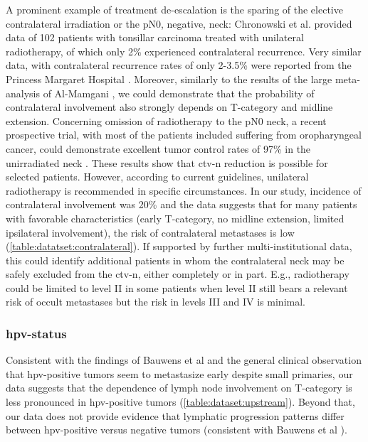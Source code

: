 \documentclass[\relativeRoot/main.tex]{subfiles}
\begin{document}
A prominent example of treatment de-escalation is the sparing of the elective contralateral irradiation or the pN0, negative, neck: Chronowski et al. \cite{chronowski_unilateral_2012} provided data of 102 patients with tonsillar carcinoma treated with unilateral radiotherapy, of which only 2\% experienced contralateral recurrence. Very similar data, with contralateral recurrence rates of only 2-3.5\% were reported from the Princess Margaret Hospital \cite{huang_re-evaluation_2017,osullivan_benefits_2001}. Moreover, similarly to the results of the large meta-analysis of Al-Mamgani \cite{al-mamgani_contralateral_2017}, we could demonstrate that the probability of contralateral involvement also strongly depends on T-category and midline extension. Concerning omission of radiotherapy to the pN0 neck, a recent prospective trial, with most of the patients included suffering from oropharyngeal cancer, could demonstrate excellent tumor control rates of 97\% in the unirradiated neck \cite{contreras_eliminating_2019}. These results show that \gls{ctv-n} reduction is possible for selected patients. However, according to current guidelines, unilateral radiotherapy is recommended in specific circumstances. In our study, incidence of contralateral involvement was 20\% and the data suggests that for many patients with favorable characteristics (early T-category, no midline extension, limited ipsilateral involvement), the risk of contralateral metastases is low (\cref{table:datatset:contralateral}). If supported by further multi-institutional data, this could identify additional patients in whom the contralateral neck may be safely excluded from the \gls{ctv-n}, either completely or in part. E.g., radiotherapy could be limited to level II in some patients when level II still bears a relevant risk of occult metastases but the risk in levels III and IV is minimal.

\subsubsection*{\Gls{hpv}-status}

Consistent with the findings of Bauwens et al \cite{bauwens_prevalence_2021} and the general clinical observation that \gls{hpv}-positive tumors seem to metastasize early despite small primaries, our data suggests that the dependence of lymph node involvement on T-category is less pronounced in \gls{hpv}-positive tumors (\cref{table:dataset:upstream}). Beyond that, our data does not provide evidence that lymphatic progression patterns differ between \gls{hpv}-positive versus negative tumors (consistent with Bauwens et al \cite{bauwens_prevalence_2021}).
\end{document}
